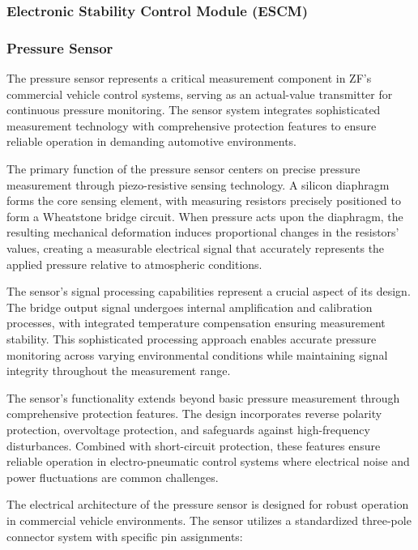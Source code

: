 \documentclass[12pt]{article}
\begin{document}
\subsubsection{Electronic Stability Control Module (ESCM)}

\subsubsection{Pressure Sensor}

The pressure sensor represents a critical measurement component in ZF's
commercial vehicle control systems, serving as an actual-value transmitter for
continuous pressure monitoring. The sensor system integrates sophisticated
measurement technology with comprehensive protection features to ensure
reliable operation in demanding automotive environments.

The primary function of the pressure sensor centers on precise pressure
measurement through piezo-resistive sensing technology. A silicon diaphragm
forms the core sensing element, with measuring resistors precisely positioned
to form a Wheatstone bridge circuit. When pressure acts upon the diaphragm, the
resulting mechanical deformation induces proportional changes in the resistors'
values, creating a measurable electrical signal that accurately represents the
applied pressure relative to atmospheric conditions.

The sensor's signal processing capabilities represent a crucial aspect of its
design. The bridge output signal undergoes internal amplification and
calibration processes, with integrated temperature compensation ensuring
measurement stability. This sophisticated processing approach enables accurate
pressure monitoring across varying environmental conditions while maintaining
signal integrity throughout the measurement range.

The sensor's functionality extends beyond basic pressure measurement through
comprehensive protection features. The design incorporates reverse polarity
protection, overvoltage protection, and safeguards against high-frequency
disturbances. Combined with short-circuit protection, these features ensure
reliable operation in electro-pneumatic control systems where electrical noise
and power fluctuations are common challenges.

The electrical architecture of the pressure sensor is designed for robust
operation in commercial vehicle environments. The sensor utilizes a
standardized three-pole connector system with specific pin assignments:
\end{document}
